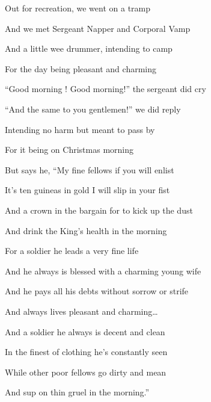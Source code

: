 \documentclass[letterpaper,10pt,english]{sphinxmanual}
\begin{document}
\begin{DUlineblock}{0em}
\item[] Out for recreation, we went on a tramp
\item[] And we met Sergeant Napper and Corporal Vamp
\item[] And a little wee drummer, intending to camp
\item[] For the day being pleasant and charming
\end{DUlineblock}

\begin{DUlineblock}{0em}
\item[] “Good morning ! Good morning!” the sergeant did cry
\item[] “And the same to you gentlemen!” we did reply
\item[] Intending no harm but meant to pass by
\item[] For it being on Christmas morning
\end{DUlineblock}

\begin{DUlineblock}{0em}
\item[] But says he, “My fine fellows if you will enlist
\item[] It’s ten guineas in gold I will slip in your fist
\item[] And a crown in the bargain for to kick up the dust
\item[] And drink the King’s health in the morning
\end{DUlineblock}

\begin{DUlineblock}{0em}
\item[] For a soldier he leads a very fine life
\item[] And he always is blessed with a charming young wife
\item[] And he pays all his debts without sorrow or strife
\item[] And always lives pleasant and charming…
\end{DUlineblock}

\begin{DUlineblock}{0em}
\item[] And a soldier he always is decent and clean
\item[] In the finest of clothing he’s constantly seen
\item[] While other poor fellows go dirty and mean
\item[] And sup on thin gruel in the morning.”
\end{DUlineblock}
\end{document}
